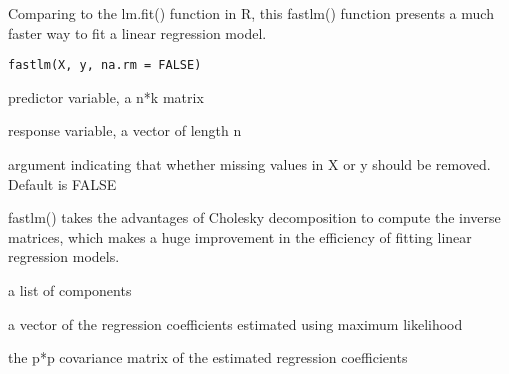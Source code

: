 \documentclass[a4paper]{book}
\begin{document}
%
\begin{Description}\relax

Comparing to the lm.fit() function in R, this fastlm() function presents a much faster way to fit a linear regression model. 
\end{Description}
%
\begin{Usage}
\begin{verbatim}
fastlm(X, y, na.rm = FALSE)
\end{verbatim}
\end{Usage}
%
\begin{Arguments}
\begin{ldescription}
\item[\code{X}] 

predictor variable, a n*k matrix

\item[\code{y}] 

response variable, a vector of length n

\item[\code{na.rm}] 

argument indicating that whether missing values in X or y should be removed. Default is FALSE 

\end{ldescription}
\end{Arguments}
%
\begin{Details}\relax

fastlm() takes the advantages of Cholesky decomposition to compute the inverse matrices, which makes a huge improvement in the efficiency of fitting linear regression models. 
\end{Details}
%
\begin{Value}





a list of components 
\begin{ldescription}
\item[\code{coefficients}] 
a vector of the regression coefficients estimated using maximum likelihood

\item[\code{vcov}] 
the p*p covariance matrix of the estimated regression coefficients

\end{ldescription}
\end{Value}
\end{document}
